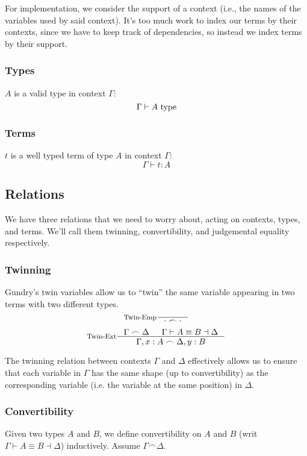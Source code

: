 For implementation, we consider the support of a context (i.e., the names of the variables used by said context).
It's too much work to index our terms by their contexts, since we have to keep track of dependencies, so instead we index terms by their support.

\subsubsection{Types}
$A$ is a valid type in context $\Gamma$:
\[
  \Gamma \vdash A \textrm{ type}
\]

\subsubsection{Terms}
$t$ is a well typed term of type $A$ in context $\Gamma$:
\[
  \Gamma \vdash t : A
\]

\subsection{Relations}
We have three relations that we need to worry about, acting on contexts, types, and terms. We'll call them twinning, convertibility, and judgemental equality respectively.

\subsubsection{Twinning}
Gundry's twin variables \cite{gundry2013TypeInferenceHaskell} \cite{gundry2013TutorialImplementationDynamic} allow us to ``twin'' the same variable appearing in two terms with two different types.
\[
  \inference[Twin-Emp]{}{\cdot \frown \cdot}
\]
\[
  \inference[Twin-Ext]
    { \Gamma \frown \Delta
    & \Gamma \vdash A \equiv B \dashv \Delta
    }
    { \Gamma, x : A \frown \Delta, y : B }
\]

The twinning relation between contexts $\Gamma$ and $\Delta$ effectively allows us to ensure that each variable in $\Gamma$ has the same shape (up to convertibility) as the corresponding variable (i.e. the variable at the same position) in $\Delta$.

\subsubsection{Convertibility}
Given two types $A$ and $B$, we define convertibility on $A$ and $B$ (writ $\Gamma \vdash A \equiv B \dashv \Delta$) inductively. Assume $\Gamma \frown \Delta$.

